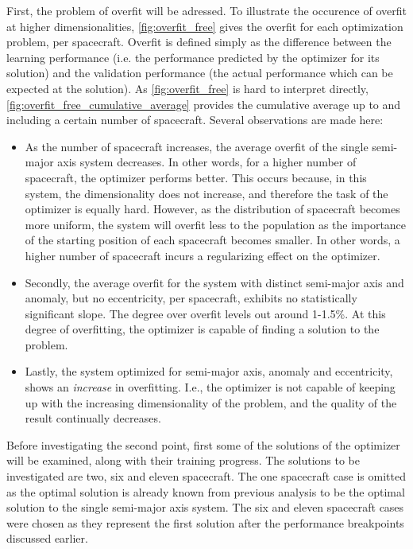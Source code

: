 First, the problem of overfit will be adressed. To illustrate the occurence of overfit at higher dimensionalities, \autoref{fig:overfit_free} gives the overfit for each optimization problem, per spacecraft. Overfit is defined simply as the difference between the learning performance (i.e. the performance predicted by the optimizer for its solution) and the validation performance (the actual performance which can be expected at the solution). As \autoref{fig:overfit_free} is hard to interpret directly, \autoref{fig:overfit_free_cumulative_average} provides the cumulative average up to and including a certain number of spacecraft. Several observations are made here:
\begin{itemize}
 \item As the number of spacecraft increases, the average overfit of the single semi-major axis system decreases. In other words, for a higher number of spacecraft, the optimizer performs better. This occurs because, in this system, the dimensionality does not increase, and therefore the task of the optimizer is equally hard. However, as the distribution of spacecraft becomes more uniform, the system will overfit less to the population as the importance of the starting position of each spacecraft becomes smaller. In other words, a higher number of spacecraft incurs a regularizing effect on the optimizer.
 \item Secondly, the average overfit for the system with distinct semi-major axis and anomaly, but no eccentricity, per spacecraft, exhibits no statistically significant slope. The degree over overfit levels out around 1-1.5\%. At this degree of overfitting, the optimizer is capable of finding a solution to the problem. 
 \item Lastly, the system optimized for semi-major axis, anomaly and eccentricity, shows an \textit{increase} in overfitting. I.e., the optimizer is not capable of keeping up with the increasing dimensionality of the problem, and the quality of the result continually decreases.
\end{itemize}
Before investigating the second point, first some of the solutions of the optimizer will be examined, along with their training progress. The solutions to be investigated are two, six and eleven spacecraft. The one spacecraft case is omitted as the optimal solution is already known from previous analysis to be the optimal solution to the single semi-major axis system. The six and eleven spacecraft cases were chosen as they represent the first solution after the performance breakpoints discussed earlier.

